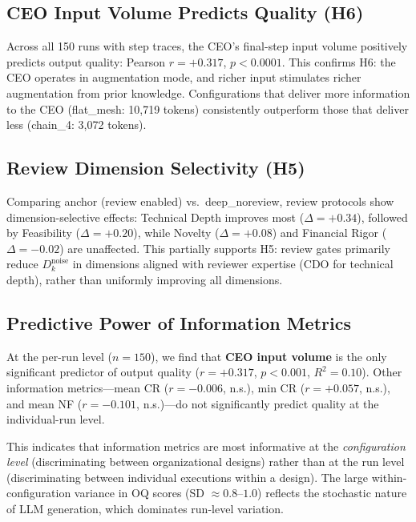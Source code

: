 \documentclass[conference]{IEEEtran}
\begin{document}
\subsection{CEO Input Volume Predicts Quality (H6)}
\label{subsec:h6_result}

Across all 150 runs with step traces, the CEO's final-step input volume positively predicts output quality: Pearson $r = +0.317$, $p < 0.0001$.
This confirms H6: the CEO operates in augmentation mode, and richer input stimulates richer augmentation from prior knowledge.
Configurations that deliver more information to the CEO (flat\_mesh: 10,719 tokens) consistently outperform those that deliver less (chain\_4: 3,072 tokens).

\subsection{Review Dimension Selectivity (H5)}
\label{subsec:h5_result}

Comparing anchor (review enabled) vs.\ deep\_noreview, review protocols show dimension-selective effects:
Technical Depth improves most ($\Delta = +0.34$), followed by Feasibility ($\Delta = +0.20$), while Novelty ($\Delta = +0.08$) and Financial Rigor ($\Delta = -0.02$) are unaffected.
This partially supports H5: review gates primarily reduce $D_k^{\text{noise}}$ in dimensions aligned with reviewer expertise (CDO for technical depth), rather than uniformly improving all dimensions.

\subsection{Predictive Power of Information Metrics}

At the per-run level ($n = 150$), we find that \textbf{CEO input volume} is the only significant predictor of output quality ($r = +0.317$, $p < 0.001$, $R^2 = 0.10$).
Other information metrics---mean CR ($r = -0.006$, n.s.), min CR ($r = +0.057$, n.s.), and mean NF ($r = -0.101$, n.s.)---do not significantly predict quality at the individual-run level.

This indicates that information metrics are most informative at the \emph{configuration level} (discriminating between organizational designs) rather than at the run level (discriminating between individual executions within a design).
The large within-configuration variance in OQ scores (SD $\approx 0.8$--$1.0$) reflects the stochastic nature of LLM generation, which dominates run-level variation.
\end{document}
